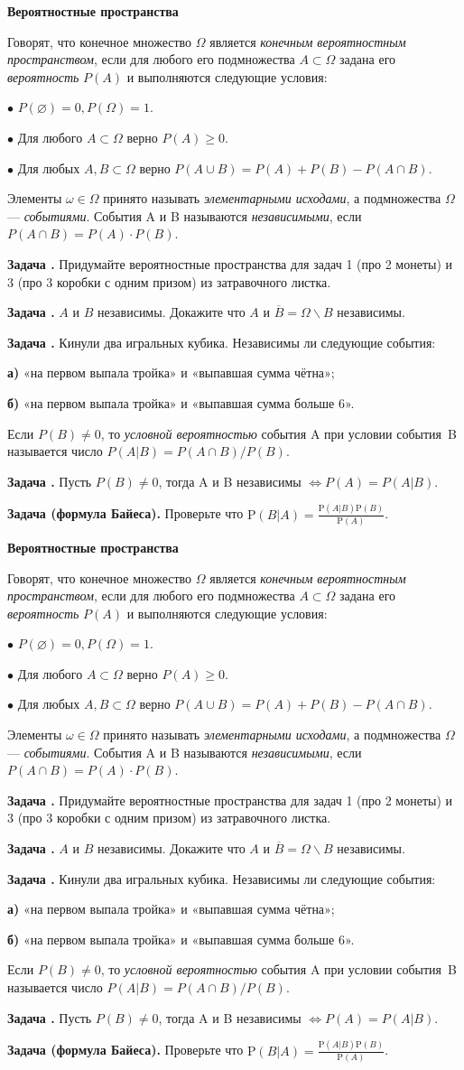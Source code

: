 \documentclass[11pt,a4paper]{article}
\def\P{\mathrm{P}}
\newcounter{znum}
\newcommand{\z}[1]{\addtocounter{znum}{1} \textbf{Задача \arabic{znum}#1. }}
\renewcommand{\!}{\textcolor{red}{!}}
\newcommand{\double}[1]{
	#1
	\vspace{2cm}
	\setcounter{znum}{0}
	#1
}
\begin{document}
\thispagestyle{empty}

\double{

\begin{center}
	\large
	\textbf{Вероятностные пространства}
	\normalsize
\end{center}

Говорят, что конечное множество $\Omega$ является \emph{конечным вероятностным пространством}, если для любого его подмножества $A \subset \Omega$ задана его \emph{вероятность} $P(A)$ и выполняются следующие условия:

$\bullet$ $P(\varnothing) = 0, P(\Omega) = 1$.

$\bullet$ Для любого $A \subset \Omega$ верно $P(A) \geqslant 0$.

$\bullet$ Для любых $A, B\subset \Omega$ верно $P(A\cup B) = P(A) + P(B) - P(A\cap B)$.

Элементы $\omega \in \Omega$ принято называть \emph{элементарными исходами}, а подмножества $\Omega$ --- \emph{событиями}. События A и B называются \emph{независимыми}, если $P(A \cap B) = P(A) \cdot P(B)$.

\z{} Придумайте вероятностные пространства для задач 1 (про 2 монеты) и 3 (про 3 коробки с одним призом) из затравочного листка.

\z{} $A$ и $B$ независимы. Докажите что $A$ и $\overline{B} = \Omega \backslash B$ независимы.

\z{} Кинули два игральных кубика. Независимы ли следующие события:

\textbf{а)} «на первом выпала тройка» и «выпавшая сумма чётна»;

\textbf{б)} «на первом выпала тройка» и «выпавшая сумма больше 6».


Если $P(B) \ne 0$, то \emph{условной вероятностью} события A при условии события~B называется число $P(A|B) = P(A \cap B)/P(B)$.

\z{} Пусть $P(B) \ne 0$, тогда A и B независимы $ \Leftrightarrow P(A) = P(A|B)$.

\z{ (формула Байеса)} Проверьте что $\P(B | A) = \frac{\P(A | B)\P(B)}{\P(A)}$.

}
\end{document}
